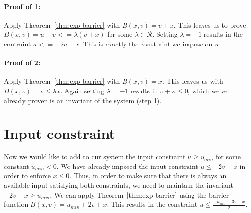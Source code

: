 \documentclass[12pt]{article}
\newcommand{\umin}{u_{min}}
\begin{document}
\paragraph*{Proof of 1:}
Apply Theorem~\ref{thm:exp-barrier} with $B(x,v) = v + x$. This leaves us
to prove $\dot{B}(x,v) = u + v <= \lambda (v + x)$ for some $\lambda \in
\mathcal{R}$. Setting $\lambda = -1$ results in the contraint $u <= -2v -
x$. This is exactly the constraint we impose on $u$.

\paragraph*{Proof of 2:}
Apply Theorem~\ref{thm:exp-barrier} with $B(x,v) = x$. This leaves us with
$\dot{B}(x,v) = v \leq \lambda x$. Again setting $\lambda = -1$ results in $v + x \leq 0$,
which we've already proven is an invariant of the system (step 1).

\section{Input constraint}
Now we would like to add to our system the input constraint $u \geq \umin$
for some constant $\umin < 0$. We have already imposed the input constraint
$u \leq -2v-x$ in order to enforce $x \leq 0$. Thus, in order to make sure
that there is always an available input satisfying both constraints, we
need to maintain the invariant $-2v-x \geq \umin$. We can apply
Theorem~\ref{thm:exp-barrier} using the barrier function $B(x,v) = \umin
+2v +x$. This results in the constraint $u \leq \frac{-\umin -3v -x}{2}$.
\end{document}
